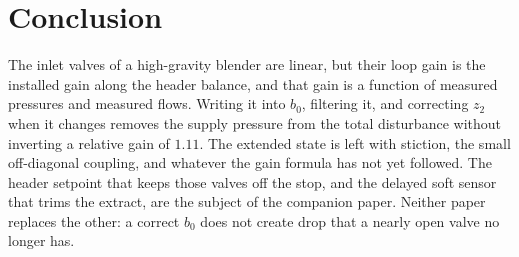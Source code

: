 \documentclass[conference,a4paper]{IEEEtran}
\begin{document}
\section{Conclusion}
The inlet valves of a high-gravity blender are linear, but their loop gain is the installed gain along the header balance, and that gain is a function of measured pressures and measured flows. Writing it into $b_0$, filtering it, and correcting $z_2$ when it changes removes the supply pressure from the total disturbance without inverting a relative gain of $1.11$. The extended state is left with stiction, the small off-diagonal coupling, and whatever the gain formula has not yet followed. The header setpoint that keeps those valves off the stop, and the delayed soft sensor that trims the extract, are the subject of the companion paper. Neither paper replaces the other: a correct $b_0$ does not create drop that a nearly open valve no longer has.



\end{document}
